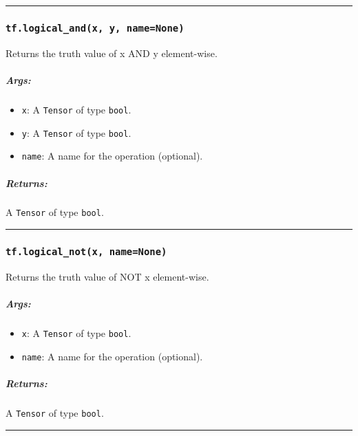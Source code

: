 \begin{center}\rule{0.5\linewidth}{\linethickness}\end{center}

\subsubsection{\texorpdfstring{\texttt{tf.logical\_and(x,\ y,\ name=None)}
}{tf.logical\_and(x, y, name=None) }}\label{tf.logicalux5fandx-y-namenone}

Returns the truth value of x AND y element-wise.

\subparagraph{Args: }\label{args-5}

\begin{itemize}
\tightlist
\item
  \texttt{x}: A \texttt{Tensor} of type \texttt{bool}.
\item
  \texttt{y}: A \texttt{Tensor} of type \texttt{bool}.
\item
  \texttt{name}: A name for the operation (optional).
\end{itemize}

\subparagraph{Returns: }\label{returns-5}

A \texttt{Tensor} of type \texttt{bool}.

\begin{center}\rule{0.5\linewidth}{\linethickness}\end{center}

\subsubsection{\texorpdfstring{\texttt{tf.logical\_not(x,\ name=None)}
}{tf.logical\_not(x, name=None) }}\label{tf.logicalux5fnotx-namenone}

Returns the truth value of NOT x element-wise.

\subparagraph{Args: }\label{args-6}

\begin{itemize}
\tightlist
\item
  \texttt{x}: A \texttt{Tensor} of type \texttt{bool}.
\item
  \texttt{name}: A name for the operation (optional).
\end{itemize}

\subparagraph{Returns: }\label{returns-6}

A \texttt{Tensor} of type \texttt{bool}.

\begin{center}\rule{0.5\linewidth}{\linethickness}\end{center}

